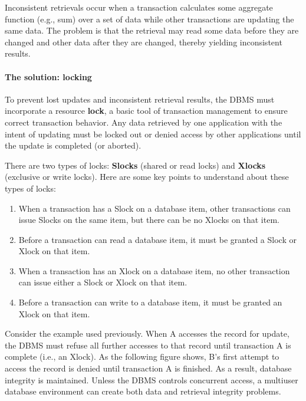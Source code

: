 \documentclass[
]{article}
\begin{document}
Inconsistent retrievals occur when a transaction calculates some
aggregate function (e.g., sum) over a set of data while other
transactions are updating the same data. The problem is that the
retrieval may read some data before they are changed and other data
after they are changed, thereby yielding inconsistent results.

\hypertarget{the-solution-locking}{%
\paragraph*{The solution: locking}\label{the-solution-locking}}

To prevent lost updates and inconsistent retrieval results, the DBMS
must incorporate a resource \textbf{lock}, a basic tool of transaction
management to ensure correct transaction behavior. Any data retrieved by
one application with the intent of updating must be locked out or denied
access by other applications until the update is completed (or aborted).

There are two types of locks: \textbf{Slocks} (shared or read locks) and
\textbf{Xlocks} (exclusive or write locks). Here are some key points to
understand about these types of locks:

\begin{enumerate}
\def\labelenumi{\arabic{enumi}.}
\item
  When a transaction has a Slock on a database item, other
  transactions can issue Slocks on the same item, but there can be no
  Xlocks on that item.
\item
  Before a transaction can read a database item, it must be granted a
  Slock or Xlock on that item.
\item
  When a transaction has an Xlock on a database item, no other
  transaction can issue either a Slock or Xlock on that item.
\item
  Before a transaction can write to a database item, it must be
  granted an Xlock on that item.
\end{enumerate}

Consider the example used previously. When A accesses the record for
update, the DBMS must refuse all further accesses to that record until
transaction A is complete (i.e., an Xlock). As the following figure
shows, B's first attempt to access the record is denied until
transaction A is finished. As a result, database integrity is
maintained. Unless the DBMS controls concurrent access, a multiuser
database environment can create both data and retrieval integrity
problems.
\end{document}
